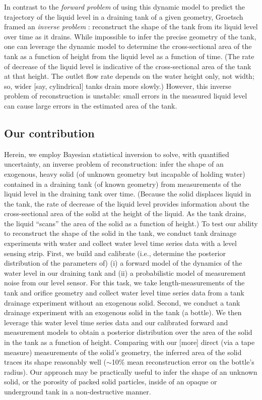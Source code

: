 \documentclass[openacc]{rsproca_new}%
\begin{document}
In contrast to the \emph{forward problem} of using this dynamic model to predict the trajectory of the liquid level in a draining tank of a given geometry, Groetsch \cite{groetsch1993inverse_tl,groetsch1999inverse} framed an \emph{inverse problem} \cite{groetsch1993inverse,neto2012introduction,tarantola2005inverse}: reconstruct the shape of the tank from its liquid level over time as it drains. 
While impossible to infer the precise geometry of the tank, one can leverage the dynamic model to determine the cross-sectional area of the tank as a function of height from the liquid level as a function of time. (The rate of decrease of the liquid level is indicative of the cross-sectional area of the tank at that height. The outlet flow rate depends on the water height only, not width; so, wider [say, cylindrical] tanks drain more slowly.)
However, this inverse problem of reconstruction is unstable: small errors in the measured liquid level can cause large errors in the estimated area of the tank. \cite{groetsch1993inverse_tl}

\subsection{Our contribution}
Herein, we employ Bayesian statistical inversion \cite{calvetti2018inverse,waqar2023tutorial,kaipio2006statistical,dashti2013bayesian} to solve, with quantified uncertainty, an inverse problem of reconstruction: infer the shape of an exogenous, heavy solid (of unknown geometry but incapable of holding water) contained in a draining tank (of known geometry) from measurements of the liquid level in the draining tank over time.
(Because the solid displaces liquid in the tank, the rate of decrease of the liquid level provides information about the cross-sectional area of the solid at the height of the liquid.
As the tank drains, the liquid ``scans'' the area of the solid as a function of height.)
To test our ability to reconstruct the shape of the solid in the tank, we conduct tank drainage experiments with water and collect water level time series data with a level sensing strip. First, we build and calibrate (i.e., determine the posterior distribution of the parameters of) (i) a forward model of the dynamics of the water level in our draining tank and (ii) a probabilistic model of measurement noise from our level sensor.
For this task, we take length-measurements of the tank and orifice geometry and collect water level time series data from a tank drainage experiment without an exogenous solid. 
Second, we conduct a tank drainage experiment with an exogenous solid in the tank (a bottle). We then leverage this water level time series data and our calibrated forward and measurement models to obtain a posterior distribution over the area of the solid in the tank as a function of height.
Comparing with our [more] direct (via a tape measure) measurements of the solid's geometry, the inferred area of the solid traces its shape reasonably well ($\sim$10\% mean reconstruction error on the bottle's radius). Our approach may be practically useful to infer the shape of an unknown solid, or the porosity of packed solid particles, inside of an opaque or underground tank in a non-destructive manner.
\end{document}
